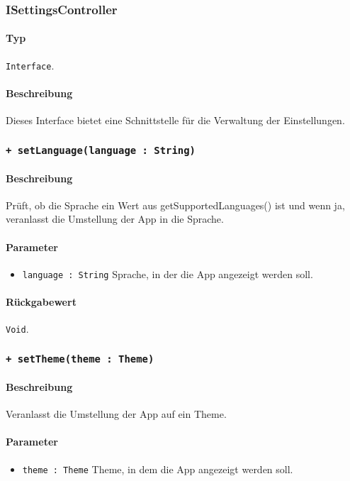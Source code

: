 \subsubsection{ISettingsController}
\paragraph*{Typ}
\texttt{Interface}.
\paragraph*{Beschreibung}
Dieses Interface bietet eine Schnittstelle für die Verwaltung der Einstellungen.

\subsubsection*{\texttt{+ setLanguage(language : String)}}%
\paragraph*{Beschreibung}
Prüft, ob die Sprache ein Wert aus getSupportedLanguages() ist und wenn ja, veranlasst die Umstellung der App in die Sprache.
\paragraph*{Parameter}
\begin{itemize}
    \item \texttt{language : String} Sprache, in der die App angezeigt werden soll.
\end{itemize}
\paragraph*{Rückgabewert}
\texttt{Void}.

\subsubsection*{\texttt{+ setTheme(theme : Theme)}}%
\paragraph*{Beschreibung}
Veranlasst die Umstellung der App auf ein Theme.
\paragraph*{Parameter}
\begin{itemize}
    \item \texttt{theme : Theme} Theme, in dem die App angezeigt werden soll.
\end{itemize}
